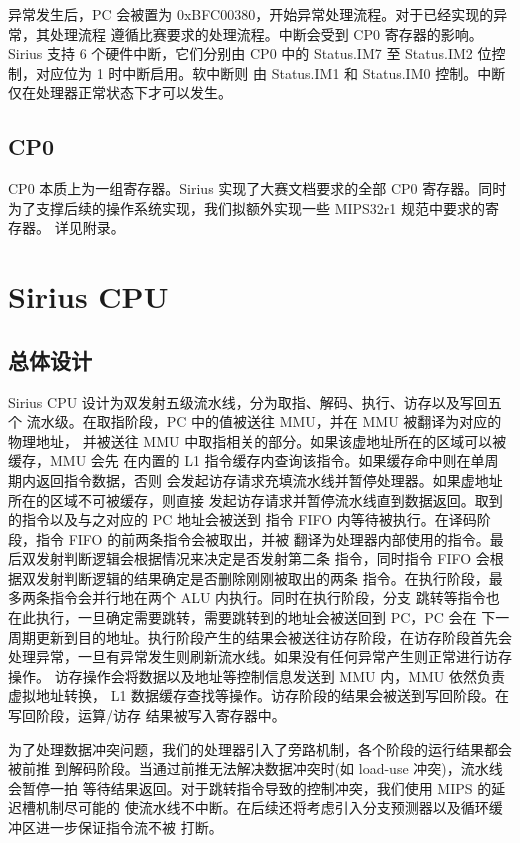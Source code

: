 \documentclass[blue,normal,cn]{elegantbook}
\begin{document}
异常发生后，PC 会被置为 0xBFC00380，开始异常处理流程。对于已经实现的异常，其处理流程
遵循比赛要求的处理流程。中断会受到 CP0 寄存器的影响。Sirius 支持 6 个硬件中断，它们分别由 CP0 
中的 Status.IM7 至 Status.IM2 位控制，对应位为 1 时中断启用。软中断则
由 Status.IM1 和 Status.IM0 控制。中断仅在处理器正常状态下才可以发生。

\section{CP0}

CP0 本质上为一组寄存器。Sirius 实现了大赛文档要求的全部 CP0 寄存器。同时
为了支撑后续的操作系统实现，我们拟额外实现一些 MIPS32r1 规范中要求的寄存器。
详见附录。

\chapter{Sirius CPU}

\section{总体设计}

Sirius CPU 设计为双发射五级流水线，分为取指、解码、执行、访存以及写回五个
流水级。在取指阶段，PC 中的值被送往 MMU，并在 MMU 被翻译为对应的物理地址，
并被送往 MMU 中取指相关的部分。如果该虚地址所在的区域可以被缓存，MMU 会先
在内置的 L1 指令缓存内查询该指令。如果缓存命中则在单周期内返回指令数据，否则
会发起访存请求充填流水线并暂停处理器。如果虚地址所在的区域不可被缓存，则直接
发起访存请求并暂停流水线直到数据返回。取到的指令以及与之对应的 PC 地址会被送到
指令 FIFO 内等待被执行。在译码阶段，指令 FIFO 的前两条指令会被取出，并被
翻译为处理器内部使用的指令。最后双发射判断逻辑会根据情况来决定是否发射第二条
指令，同时指令 FIFO 会根据双发射判断逻辑的结果确定是否删除刚刚被取出的两条
指令。在执行阶段，最多两条指令会并行地在两个 ALU 内执行。同时在执行阶段，分支
跳转等指令也在此执行，一旦确定需要跳转，需要跳转到的地址会被送回到 PC，PC 会在
下一周期更新到目的地址。执行阶段产生的结果会被送往访存阶段，在访存阶段首先会
处理异常，一旦有异常发生则刷新流水线。如果没有任何异常产生则正常进行访存操作。
访存操作会将数据以及地址等控制信息发送到 MMU 内，MMU 依然负责虚拟地址转换，
L1 数据缓存查找等操作。访存阶段的结果会被送到写回阶段。在写回阶段，运算/访存
结果被写入寄存器中。

为了处理数据冲突问题，我们的处理器引入了旁路机制，各个阶段的运行结果都会被前推
到解码阶段。当通过前推无法解决数据冲突时(如 load-use 冲突)，流水线会暂停一拍
等待结果返回。对于跳转指令导致的控制冲突，我们使用 MIPS 的延迟槽机制尽可能的
使流水线不中断。在后续还将考虑引入分支预测器以及循环缓冲区进一步保证指令流不被
打断。
\end{document}
